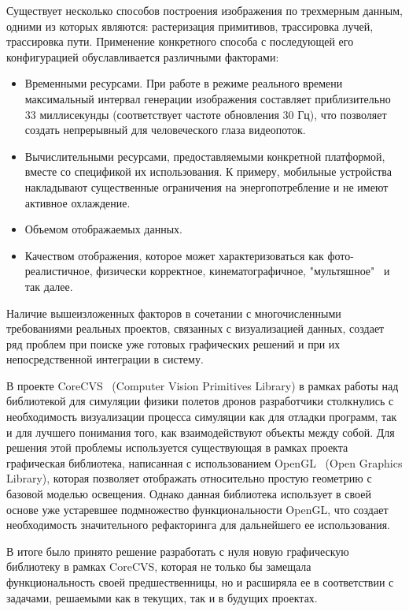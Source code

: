 \documentclass[14pt]{matmex-diploma}
\begin{document}
Существует несколько способов построения изображения по трехмерным данным, одними из которых являются: растеризация примитивов, трассировка лучей, трассировка пути. Применение конкретного способа с последующей его конфигурацией обуславливается различными факторами:

\begin{itemize}
    \item Временными ресурсами. При работе в режиме реального времени максимальный интервал генерации изображения составляет приблизительно 33 миллисекунды (соответствует частоте обновления 30 Гц), что позволяет создать непрерывный для человеческого глаза видеопоток.
    \item Вычислительными ресурсами, предоставляемыми конкретной платформой, вместе со спецификой их использования. К примеру, мобильные устройства накладывают существенные ограничения на энергопотребление и не имеют активное охлаждение.
    \item Объемом отображаемых данных.
    \item Качеством отображения, которое может характеризоваться как фото-реалистичное, физически корректное, кинематографичное, "мультяшное"~\cite{wiki:celshading} и так далее. 
\end{itemize}

Наличие вышеизложенных факторов в сочетании с многочисленными требованиями реальных проектов, связанных с визуализацией данных, создает ряд проблем при поиске уже готовых графических решений и при их непосредственной интеграции в систему.       

В проекте CoreCVS~\cite{github:corecvs} (Computer Vision Primitives Library) в рамках работы над библиотекой для симуляции физики полетов дронов разработчики столкнулись с необходимость визуализации процесса симуляции как для отладки программ, так и для лучшего понимания того, как взаимодействуют объекты между собой. Для решения этой проблемы используется существующая в рамках проекта графическая библиотека, написанная с использованием OpenGL~\cite{spec:opengl} (Open Graphics Library), которая позволяет отображать относительно простую геометрию с базовой моделью освещения. Однако данная библиотека использует в своей основе уже устаревшее подмножество функциональности OpenGL, что создает необходимость значительного рефакторинга для дальнейшего ее использования.    

В итоге было принято решение разработать с нуля новую графическую библиотеку в рамках CoreCVS, которая не только бы замещала функциональность своей предшественницы, но и расширяла ее в соответствии с задачами, решаемыми как в текущих, так и в будущих проектах.
\end{document}
